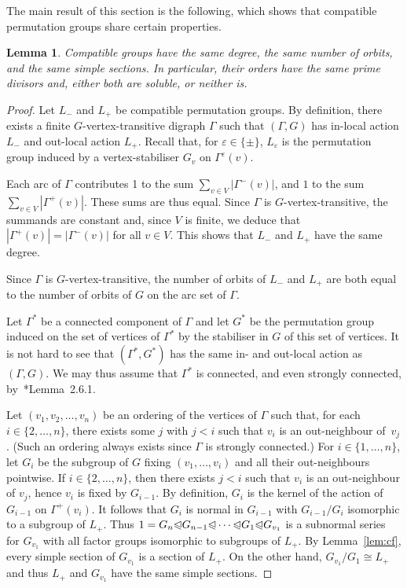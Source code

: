 \documentclass[twoside,12pt,leqno]{amsproc}
\numberwithin{table}{section}
\numberwithin{figure}{section}
\theoremstyle{plain}
\newtheorem{lemma}[theorem]{Lemma}
\theoremstyle{definition}\newtheorem{definition}[theorem]{Definition}
\theoremstyle{definition}\newtheorem{example}[theorem]{Example}
\theoremstyle{definition}\newtheorem{construction}[theorem]{Construction}
\theoremstyle{definition}\newtheorem{remark}[theorem]{Remark}
\theoremstyle{definition}\newtheorem{problem}[theorem]{Problem}
\begin{document}
The main result of this section is the following, which shows that compatible permutation groups share certain properties. 

\begin{lemma}\label{lem:prop}
Compatible groups have the same degree, the same number of orbits, and the same simple sections. In particular, their orders have the same prime divisors and, either both are soluble, or neither is.
\end{lemma}
\begin{proof}
Let $L_-$ and $L_+$ be compatible permutation groups. By definition, there exists a finite $G$-vertex-transitive digraph $\Gamma$ such that $(\Gamma,G)$ has in-local action $L_-$ and out-local action $L_+$. Recall that, for ${\varepsilon}\in\{\pm\}$, $L_{\varepsilon}$ is the permutation group induced by a vertex-stabiliser $G_v$ on $\Gamma^{\varepsilon}(v)$.

Each arc of $\Gamma$ contributes 1 to the sum $\sum_{v\in V} |\Gamma^-(v)|$, and $1$ to the sum $\sum_{v\in V}|\Gamma^+(v)|$. These sums are thus equal. Since $\Gamma$ is $G$-vertex-transitive, the summands are constant and, since $V$ is finite,  we deduce that $|\Gamma^+(v)|=|\Gamma^-(v)|$ for all $v\in V$. This shows that $L_-$ and $L_+$ have the same degree.

Since $\Gamma$ is $G$-vertex-transitive, the number of orbits of $L_-$ and $L_+$ are both equal to the number of orbits of $G$ on the arc set of $\Gamma$.

Let $\Gamma^*$ be a connected component of $\Gamma$ and let $G^*$ be the permutation group induced on the set of vertices of $\Gamma^*$ by the stabiliser in $G$ of this set of vertices. It is not hard to see that $(\Gamma^*,G^*)$ has the same in- and out-local action as $(\Gamma,G)$. We may thus assume that $\Gamma^*$ is connected, and even strongly connected, by~\cite{GR}*{Lemma~2.6.1}. 

Let $(v_1, v_2,\ldots, v_n)$ be an ordering of the vertices of $\Gamma$ such that, for each $i\in\{2,\ldots,n\}$, there exists some $j$ with $j<i$ such that $v_i$ is an out-neighbour of~$v_j$. (Such an ordering always exists since $\Gamma$ is strongly connected.) For $i\in \{1,\dots,n\}$, let $G_i$ be the subgroup of $G$ fixing $(v_1,\dots,v_i)$ and all their out-neighbours pointwise. If $i\in\{2,\dots, n\}$, then there exists $j<i$ such that $v_i$ is an out-neighbour of $v_j$, hence $v_i$ is fixed by $G_{i-1}$. By definition, $G_i$ is the kernel of the action of $G_{i-1}$ on $\Gamma^+(v_i)$. It follows that $G_i$ is normal in $G_{i-1}$ with $G_{i-1}/G_i$ isomorphic to a subgroup of $L_+$. Thus  $1=G_n{\trianglelefteqslant} G_{n-1}{\trianglelefteqslant}\cdots{\trianglelefteqslant} G_1{\trianglelefteqslant} G_{v_1}$ is a subnormal series for $G_{v_1}$ with all factor groups isomorphic to subgroups of $L_+$. By Lemma~\ref{lem:cf},  every simple section of $G_{v_1}$ is a section of $L_+$. On the other hand, $G_{v_1}/G_1\cong L_+$ and thus $L_+$ and $G_{v_1}$ have the same simple sections.


\end{proof}
\end{document}
